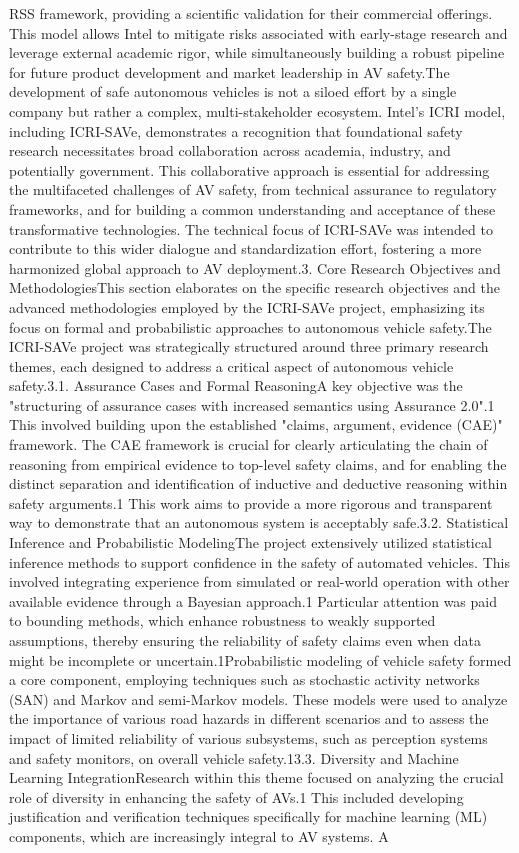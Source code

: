 RSS framework, providing a scientific validation for their commercial offerings. This model allows Intel to mitigate risks associated with early-stage research and leverage external academic rigor, while simultaneously building a robust pipeline for future product development and market leadership in AV safety.The development of safe autonomous vehicles is not a siloed effort by a single company but rather a complex, multi-stakeholder ecosystem. Intel's ICRI model, including ICRI-SAVe, demonstrates a recognition that foundational safety research necessitates broad collaboration across academia, industry, and potentially government. This collaborative approach is essential for addressing the multifaceted challenges of AV safety, from technical assurance to regulatory frameworks, and for building a common understanding and acceptance of these transformative technologies. The technical focus of ICRI-SAVe was intended to contribute to this wider dialogue and standardization effort, fostering a more harmonized global approach to AV deployment.3. Core Research Objectives and MethodologiesThis section elaborates on the specific research objectives and the advanced methodologies employed by the ICRI-SAVe project, emphasizing its focus on formal and probabilistic approaches to autonomous vehicle safety.The ICRI-SAVe project was strategically structured around three primary research themes, each designed to address a critical aspect of autonomous vehicle safety.3.1. Assurance Cases and Formal ReasoningA key objective was the "structuring of assurance cases with increased semantics using Assurance 2.0".1 This involved building upon the established "claims, argument, evidence (CAE)" framework. The CAE framework is crucial for clearly articulating the chain of reasoning from empirical evidence to top-level safety claims, and for enabling the distinct separation and identification of inductive and deductive reasoning within safety arguments.1 This work aims to provide a more rigorous and transparent way to demonstrate that an autonomous system is acceptably safe.3.2. Statistical Inference and Probabilistic ModelingThe project extensively utilized statistical inference methods to support confidence in the safety of automated vehicles. This involved integrating experience from simulated or real-world operation with other available evidence through a Bayesian approach.1 Particular attention was paid to bounding methods, which enhance robustness to weakly supported assumptions, thereby ensuring the reliability of safety claims even when data might be incomplete or uncertain.1Probabilistic modeling of vehicle safety formed a core component, employing techniques such as stochastic activity networks (SAN) and Markov and semi-Markov models. These models were used to analyze the importance of various road hazards in different scenarios and to assess the impact of limited reliability of various subsystems, such as perception systems and safety monitors, on overall vehicle safety.13.3. Diversity and Machine Learning IntegrationResearch within this theme focused on analyzing the crucial role of diversity in enhancing the safety of AVs.1 This included developing justification and verification techniques specifically for machine learning (ML) components, which are increasingly integral to AV systems. A 